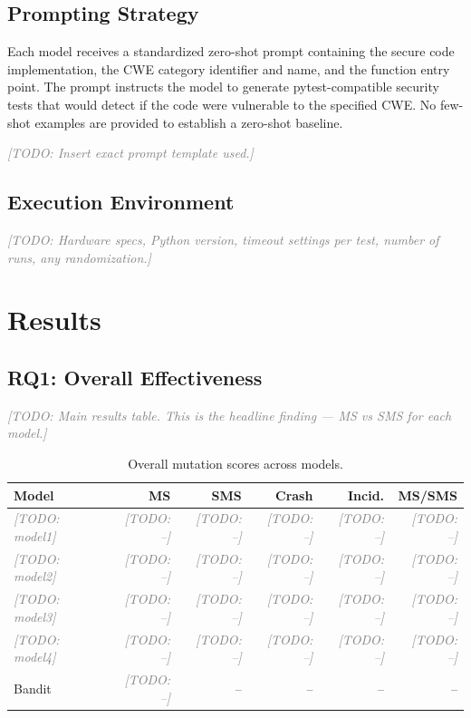 \documentclass[sigconf,review,anonymous]{acmart}
\newcommand{\todo}[1]{\textcolor{gray}{\textit{[TODO: #1]}}}
\begin{document}
\subsection{Prompting Strategy}

Each model receives a standardized zero-shot prompt containing the secure code implementation, the CWE category identifier and name, and the function entry point. The prompt instructs the model to generate pytest-compatible security tests that would detect if the code were vulnerable to the specified CWE. No few-shot examples are provided to establish a zero-shot baseline.

\todo{Insert exact prompt template used.}


\subsection{Execution Environment}

\todo{Hardware specs, Python version, timeout settings per test, number of runs, any randomization.}


\section{Results}\label{sec:results}

\subsection{RQ1: Overall Effectiveness}

\todo{Main results table. This is the headline finding --- MS vs SMS for each model.}

\begin{table}[t]
\caption{Overall mutation scores across models.}
\label{tab:rq1}
\small
\begin{tabular}{lrrrrr}
\toprule
\textbf{Model} & \textbf{MS} & \textbf{SMS} & \textbf{Crash} & \textbf{Incid.} & \textbf{MS/SMS} \\
\midrule
\todo{model1} & \todo{--} & \todo{--} & \todo{--} & \todo{--} & \todo{--} \\
\todo{model2} & \todo{--} & \todo{--} & \todo{--} & \todo{--} & \todo{--} \\
\todo{model3} & \todo{--} & \todo{--} & \todo{--} & \todo{--} & \todo{--} \\
\todo{model4} & \todo{--} & \todo{--} & \todo{--} & \todo{--} & \todo{--} \\
\midrule
Bandit & \todo{--} & -- & -- & -- & -- \\
\bottomrule
\end{tabular}
\end{table}
\end{document}
